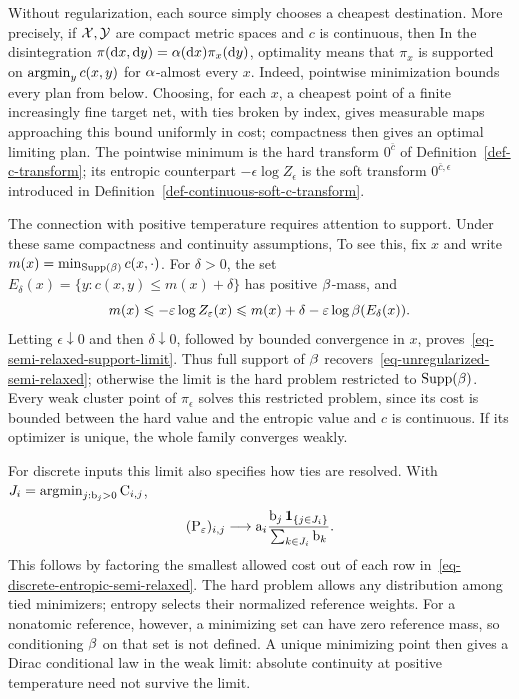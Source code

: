 Without regularization, each source simply chooses a cheapest destination. More precisely, if $\mathcal{X},\mathcal{Y}$ are compact metric spaces and $c$ is continuous, then
In the disintegration $\pi(\mathrm{d} x,\mathrm{d} y)=\alpha(\mathrm{d} x)\pi_x(\mathrm{d} y)$, optimality means that $\pi_x$ is supported on $\operatorname{argmin}_y c(x,y)$ for $\alpha$-almost every $x$. Indeed, pointwise minimization bounds every plan from below. Choosing, for each $x$, a cheapest point of a finite increasingly fine target net, with ties broken by index, gives measurable maps approaching this bound uniformly in cost; compactness then gives an optimal limiting plan. The pointwise minimum is the hard transform $0^{\bar c}$ of Definition~\ref{def-c-transform}; its entropic counterpart $-\epsilon\log Z_\epsilon$ is the soft transform $0^{\bar c,\epsilon}$ introduced in Definition~\ref{def-continuous-soft-c-transform}.

The connection with positive temperature requires attention to support. Under these same compactness and continuity assumptions,
To see this, fix $x$ and write $m(x)=\min_{\operatorname{Supp}(\beta)}c(x,\cdot)$. For $\delta>0$, the set $E_\delta(x)=\{y:c(x,y)\leq m(x)+\delta\}$ has positive $\beta$-mass, and
\[
    m(x)\leqslant-\varepsilon\log Z_\varepsilon(x)
       \leqslant m(x)+\delta-\varepsilon\log\beta(E_\delta(x)).
\]
Letting $\epsilon\downarrow0$ and then $\delta\downarrow0$, followed by bounded convergence in $x$, proves~\eqref{eq-semi-relaxed-support-limit}. Thus full support of $\beta$ recovers~\eqref{eq-unregularized-semi-relaxed}; otherwise the limit is the hard problem restricted to $\operatorname{Supp}(\beta)$. Every weak cluster point of $\pi_\epsilon$ solves this restricted problem, since its cost is bounded between the hard value and the entropic value and $c$ is continuous. If its optimizer is unique, the whole family converges weakly.

For discrete inputs this limit also specifies how ties are resolved. With $J_i=\operatorname{argmin}_{j:\mathrm{b}_j>0}\mathrm{C}_{i,j}$,
\[
    (\mathrm{P}_\varepsilon)_{i,j}\longrightarrow
    \mathrm{a}_i\frac{\mathrm{b}_j\,\mathbf 1_{\{j\in J_i\}}}{\sum_{k\in J_i}\mathrm{b}_k}.
\]
This follows by factoring the smallest allowed cost out of each row in~\eqref{eq-discrete-entropic-semi-relaxed}. The hard problem allows any distribution among tied minimizers; entropy selects their normalized reference weights. For a nonatomic reference, however, a minimizing set can have zero reference mass, so conditioning $\beta$ on that set is not defined. A unique minimizing point then gives a Dirac conditional law in the weak limit: absolute continuity at positive temperature need not survive the limit.


